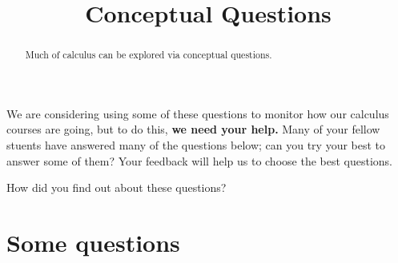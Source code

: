 \documentclass{ximera}
\title{Conceptual Questions}
\begin{document}
\begin{abstract}
  Much of calculus can be explored via conceptual questions.
\end{abstract}
\maketitle

We are considering using some of these questions to monitor how our
calculus courses are going, but to do this, \textbf{we need your
  help.}  Many of your fellow stuents have answered many of the
questions below; can you try your best to answer some of them?  Your
feedback will help us to choose the best questions.

\begin{question}
How did you find out about these questions?
\begin{freeResponse}
\end{freeResponse}
\end{question}

\section{Some questions}
\end{document}
